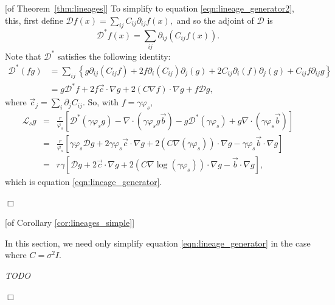 \documentclass[12pt]{article}
\newenvironment {proof}{{\noindent\bf Proof }}{\hfill $\Box$ \medskip}
\newcommand{\grad}{\nabla}
\newcommand{\DD}{\mathcal{D}}  %
\newcommand{\meanq}{\vec b}    %
\newcommand{\covq}{C}     %
\newcommand{\Lgen}{\mathcal{L}}    %
\newcommand{\comment}[1]{{\color{blue} \it #1}}
\begin{document}
\begin{proof}[of Theorem~\ref{thm:lineages}]
To simplify to equation \eqref{eqn:lineage_generator2},
this, first define
$
    \DD f(x) = \sum_{ij} \covq_{ij} \partial_{ij} f(x),
$
and so the adjoint of $\DD$ is
$$
    \DD^* f(x)
    =
    \sum_{ij} \partial_{ij} (\covq_{ij} f(x)) .
$$
Note that $\DD^*$ satisfies the following identity:
\begin{align*}
    \DD^*(fg)
    &=
    \sum_{ij} \left\{
        g \partial_{ij} (\covq_{ij} f)
        + 2 f \partial_{i} (\covq_{ij}) \partial_j(g)
        + 2 \covq_{ij} \partial_{i} (f) \partial_j(g)
        + \covq_{ij} f \partial_{ij} g
    \right\} \\
    &=
    g \DD^* f
    + 2 f \vec{c} \cdot \grad g
    + 2 (C \grad f) \cdot \grad g
    + f \DD g ,
\end{align*}
where $\vec{c}_j = \sum_i \partial_j C_{ij}$.
So, with $f = \gamma \varphi_s$,
\begin{eqnarray*}
\Lgen_s g
    &=&
    \frac{r}{\varphi_s} \left[
        \DD^*(\gamma \varphi_s g) - \grad \cdot (\gamma \varphi_s g \meanq)
        - g \DD^*(\gamma \varphi_s) + g \grad \cdot (\gamma \varphi_s \meanq)
    \right] \\
    &=&
    \frac{r}{\varphi_s} \left[
        \gamma \varphi_s \DD g
        + 2 \gamma \varphi_s \vec{c} \cdot \grad g
        + 2 (C \grad (\gamma \varphi_s)) \cdot \grad g
        - \gamma \varphi_s \meanq \cdot \grad g
    \right] \\
    &=&
    r \gamma \left[
        \DD g
        + 2 \vec{c} \cdot \grad g
        + 2 (C \grad \log(\gamma \varphi_s)) \cdot \grad g
        - \meanq \cdot \grad g
    \right] ,
\end{eqnarray*}
which is equation \eqref{eqn:lineage_generator}.

\end{proof}


\begin{proof}[of Corollary \ref{cor:lineages_simple}]

In this section, we need only
simplify equation \eqref{eqn:lineage_generator}
in the case where $\covq = \sigma^2 I$.

    \comment{TODO}

\end{proof}
\end{document}
